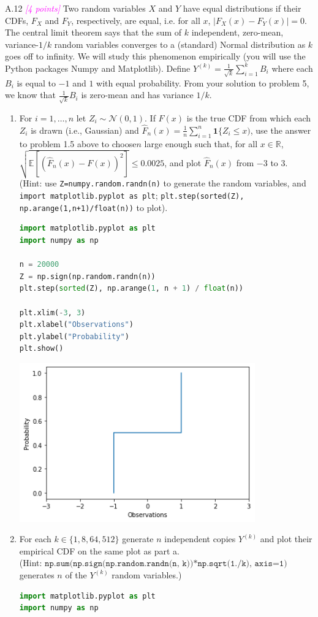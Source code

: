 \documentclass{article}
\newcommand{\field}[1]{\mathbb{#1}}
\newcommand{\1}{\mathbf{1}}
\newcommand{\E}{\mathbb{E}}
\newcommand{\R}{\field{R}} %
\newcommand{\points}[1]{\small\textcolor{magenta}{\emph{[#1 points]}} \normalsize}
\begin{document}
A.12 \points{4} Two random variables $X$ and $Y$ have equal
  distributions if their CDFs, $F_X$ and $F_Y$, respectively, are
  equal, i.e. for all $x$, $ |F_X(x) - F_Y(x)| = 0$. 
The central limit theorem says that the sum of $k$ independent,
zero-mean, variance-$1/k$ random variables converges to a (standard) Normal distribution as $k$ goes off to infinity.  
We will study this phenomenon empirically (you will use the Python packages Numpy and Matplotlib). 
Define $Y^{(k)} = \frac{1}{\sqrt{k}} \sum_{i=1}^k B_i$ where each $B_i$ is equal to $-1$ and $1$ with equal probability.
From your solution to problem 5, we know that $\frac{1}{\sqrt{k}} B_i$ is zero-mean and has variance $1/k$.
\begin{enumerate}
\item For $i=1,\dots,n$ let $Z_i \sim \mathcal{N}(0,1)$. If $F(x)$ is the true CDF from which each $Z_i$ is drawn (i.e., Gaussian) and $\widehat{F}_n(x) = \frac{1}{n} \sum_{i=1}^n \1\{ Z_i \leq x)$, use the answer to problem 1.5 above to choose$n$ large enough such that, for all $x \in \R$, $ \sqrt{\E[(\widehat{F}_n(x)-F(x))^2 ]} \leq 0.0025$, and plot $\widehat{F}_n(x)$ from $-3$ to $3$. \\(Hint: use \texttt{Z=numpy.random.randn(n)} to generate the random variables, and \texttt{import matplotlib.pyplot as plt}; \texttt{plt.step(sorted(Z), np.arange(1,n+1)/float(n))} to plot). 
	\begin{lstlisting}[language=Python]
import matplotlib.pyplot as plt
import numpy as np

n = 20000
Z = np.sign(np.random.randn(n))
plt.step(sorted(Z), np.arange(1, n + 1) / float(n))

plt.xlim(-3, 3)
plt.xlabel("Observations")
plt.ylabel("Probability")
plt.show()
    \end{lstlisting}
    \begin{center}
    \includegraphics[width=4in]{HW0_plots/cumdist1.png}
    \end{center} 
\item For each $k \in \{1, 8, 64, 512\}$ generate $n$ independent copies $Y^{(k)}$ and plot their empirical CDF on the same plot as part a.\\ (Hint: $\texttt{np.sum(np.sign(np.random.randn(n, k))*np.sqrt(1./k), axis=1)}$ generates $n$ of the $Y^{(k)}$ random variables.) 
	\begin{lstlisting}[language=Python]
import matplotlib.pyplot as plt
import numpy as np


\end{lstlisting}
\end{enumerate}
\end{document}
